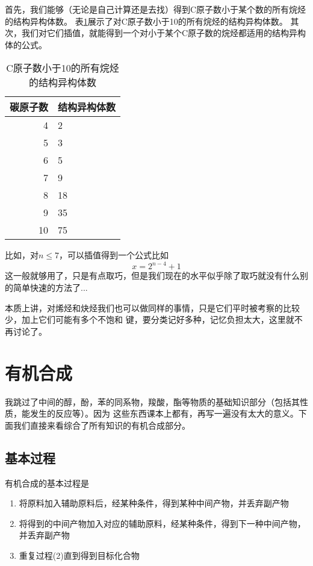 首先，我们能够（无论是自己计算还是去找）得到C原子数小于某个数的所有烷烃的结构异构体数。
表\ref{table:NumStructuralIsomers}展示了对C原子数小于10的所有烷烃的结构异构体数。
其次，我们对它们插值，就能得到一个对小于某个C原子数的烷烃都适用的结构异构体的公式。
\begin{table}[!hbtp]
\begin{center}
\begin{tabular}{r|l}
\hline
碳原子数 & 结构异构体数 \\
\hline
4 & 2 \\
\hline
5 & 3 \\
\hline
6 & 5 \\
\hline
7 & 9 \\
\hline
8 & 18 \\
\hline
9 & 35 \\
\hline
10 & 75 \\
\hline
\end{tabular}
\end{center}
\caption{C原子数小于10的所有烷烃的结构异构体数}
\label{table:NumStructuralIsomers}
\end{table}

比如，对$n \leq 7$，可以插值得到一个公式比如
\begin{equation}
x = 2^{n-4} + 1
\end{equation}
这一般就够用了，只是有点取巧，但是我们现在的水平似乎除了取巧就没有什么别的简单快速的方法了...

本质上讲，对烯烃和炔烃我们也可以做同样的事情，只是它们平时被考察的比较少，加上它们可能有多个不饱和
键，要分类记好多种，记忆负担太大，这里就不再讨论了。

\section{有机合成}
我跳过了中间的醇，酚，苯的同系物，羧酸，酯等物质的基础知识部分（包括其性质，能发生的反应等）。因为
这些东西课本上都有，再写一遍没有太大的意义。下面我们直接来看综合了所有知识的有机合成部分。

\subsection{基本过程}
有机合成的基本过程是
\begin{enumerate}
\item 将原料加入辅助原料后，经某种条件，得到某种中间产物，并丢弃副产物
\item 将得到的中间产物加入对应的辅助原料，经某种条件，得到下一种中间产物，并丢弃副产物
\item 重复过程(2)直到得到目标化合物
\end{enumerate}

